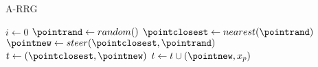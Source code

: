 \begin{algorithm}
    \small
	\caption{A-RRG}\label{alg:arrg}
	\begin{algorithmic}[1]
	    \State $i \gets 0$
	     
    	    \State $\pointrand \gets random()$
	        \State $\pointclosest \gets nearest(\pointrand)$
	        \If{$\pointclosest \in \advicesource$}
	            \State $\pointnew \gets steer(\pointclosest, \pointrand)$
                    \State $t \gets (\pointclosest, \pointnew)$ 
                            \State $t \gets t \cup (\pointnew, x_p)$
                        \EndIf
                    \EndFor
	            \EndIf
	        \EndIf
	    \EndWhile
		\State {}
		\EndProcedure
	\end{algorithmic}
\end{algorithm}





